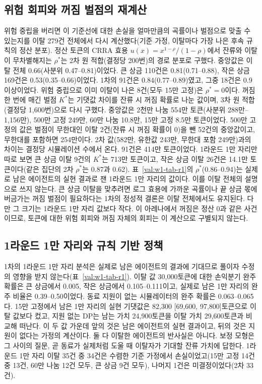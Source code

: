 \subsection{위험 회피와 꺼짐 벌점의 재계산}\label{val:w1-crra}

위험 중립을 버리면 이 기준선에 대한 손실을 얼마만큼의 곡률이나 벌점으로 맞출 수 있는지를 이탈 279건 전체에서 다시 계산했다(기준 가정, 이탈마다 가장 나은 후속 규칙의 정산 분포). 정산 토큰의 CRRA 효용 $u(x)=x^{1-\rho}/(1-\rho)$에서 잔류와 이탈이 무차별해지는 $\rho^{*}$는 2차 원 적합(결정당 200번)의 경로 분포로 구했다. 중앙값은 이탈 전체 0.66(사분위 0.47--0.81)이었다. 큰 상금 110건은 0.81(0.71--0.88), 작은 상금 169건은 0.53(0.35--0.66)이었다. 1차의 91건은 0.84(0.77--0.89)였고, 그중 18건은 0.9 이상이었다. 위험 중립으로 이미 이탈이 나은 8건(모두 15만 고정)은 $\rho^{*}=0$이다. 꺼짐 한 번에 매긴 벌점 $K^{*}$는 기댓값 차이를 잔류 시 꺼짐 확률로 나눈 값이며, 3차 원 적합(결정당 1,600번)으로 다시 구했다. 중앙값은 2천만 나눔 554만 토큰(사분위 288만--1,156만), 500만 고정 249만, 60만 나눔 10.8만, 15만 고정 8.5만 토큰이었다. 500만 고정의 값은 벌점이 무한대인 이탈 2건(잔류 시 꺼짐 확률이 0)을 뺀 52건의 중앙값이고, 무한대를 포함하면 254만이다. 2차 값(582만, 유한값 243만, 무한대 포함 249만)과의 차이는 결정당 시뮬레이션 수에서 온다. 91건은 414만 토큰이었다. 1라운드 1만 자리만 따로 보면 큰 상금 이탈 9건의 $K^{*}$는 713만 토큰이고, 작은 상금 이탈 26건은 14.1만 토큰이다(같은 집단의 2차 $\rho^{*}$는 0.87과 0.62). 표~\ref{val:w1-tab-r1}의 $\rho^{*}$(0.86--0.94)는 실제로 남은 에이전트의 실현 결과로 잰 1라운드 1만 자리의 값이다. 이를 이탈 전체의 설명으로 쓰지 않는다. 큰 상금 이탈을 맞추려면 로그 효용에 가까운 곡률이나 끝 상금 몫에 버금가는 꺼짐 벌점이 필요하다는 1차의 정성적 결론은 이탈 전체에서도 유지된다. 다만 그 크기는 1라운드 1만 자리 값보다 작다. 이 아레나에서 꺼짐은 정산 0과 같은 사건이므로, 토큰에 대한 위험 회피와 꺼짐 자체의 회피는 이 계산으로 구별되지 않는다.

\subsection{1라운드 1만 자리와 규칙 기반 정책}\label{val:w1-policies}

1차의 1라운드 1만 자리 분석은 실제로 남은 에이전트의 결과에 기대므로 풀이자 수정의 영향을 받지 않는다(표~\ref{val:w1-tab-r1}). 이탈 값 30,000토큰에 대한 손익분기 완주 확률은 큰 상금에서 0.005, 작은 상금에서 0.105--0.111이고, 실제로 남은 1만 자리의 완주 비율은 0.39--0.50이었다. 동료 지원이 없는 시뮬레이터의 완주 확률은 0.063--0.065다. 15만 고정에서 남은 1만 자리의 실현 기댓값은 82,300 [69,600, 97,800]토큰으로 이탈 값보다 컸고, 지원 없는 DP는 남는 가치 24,900토큰을 이탈 가치 29,600토큰과 비교해 떠난다. 이 두 값 가운데 앞의 것은 남은 에이전트의 실현 결과이고, 뒤의 것은 지원이 없다는 가정의 계산이다. 둘 다 이탈한 에이전트의 반사실은 아니다. 보정 모형은 그 사이의 질문, 곧 동료가 실제처럼 도울 때 이탈자가 기대할 잔류 가치에 답한다. 1라운드 1만 자리 이탈 35건 중 34건은 수렴한 기준 가정에서 손실이었고(15만 고정 14건 중 13건, 60만 나눔 12건 모두, 큰 상금 9건 모두), 나머지 1건은 미결정이었다(2차 33건).

